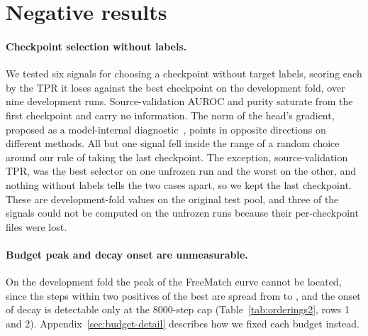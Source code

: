 \section{Negative results}
\label{sec:negative}

\paragraph{Checkpoint selection without labels.} We tested six signals for choosing a
checkpoint without target labels, scoring each by the TPR it loses against the best checkpoint
on the development fold, over nine development runs. Source-validation AUROC and purity
saturate from the first checkpoint and carry no information. The norm of the head's gradient,
proposed as a model-internal diagnostic~\citep{headgradnorm}, points in opposite directions on
different methods. All but one signal fell inside the range
of a random choice around our rule of taking the last checkpoint. The exception,
source-validation TPR, was the best selector on one unfrozen run and the worst on the other,
and nothing without labels tells the two cases apart, so we kept the last checkpoint. These are
development-fold values on the original test pool, and three of the signals could not be
computed on the unfrozen runs because their per-checkpoint files were lost.

\paragraph{Budget peak and decay onset are unmeasurable.} On the development fold the peak of
the FreeMatch curve cannot be located, since the steps within two positives of the best are
spread from \rwFzStepMin{} to \rwFzStepMax{}, and the onset of decay is detectable only at the
8000-step cap (Table~\ref{tab:orderings2}, rows 1 and 2). Appendix~\ref{sec:budget-detail}
describes how we fixed each budget instead.

